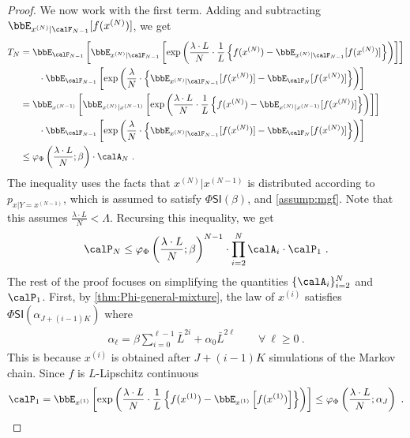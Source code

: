 \documentclass[11pt]{article}
\newcounter{ct}
\newcommand{\PhiSI}[1]{\Phi\mathsf{SI}\left(#1\right)}
\begin{document}
\begin{proof}
We now work with the first term.
Adding and subtracting \(\bbE_{x^{(N)} | \calF_{N - 1}}[f(x^{(N)})]\), we get
\begin{align*}
    T_{N} &= \bbE_{\calF_{N - 1}}\left[\bbE_{x^{(N)} | \calF_{N - 1}}\left[\exp\left(\frac{\lambda \cdot L}{N} \cdot \frac{1}{L}\left\{f(x^{(N)}) - \bbE_{x^{(N)} | \calF_{N - 1}}[f(x^{(N)})]\right\}\right)\right]\right] \\
    &\qquad \cdot \bbE_{\calF_{N - 1}}\left[\exp\left(\frac{\lambda}{N} \cdot \left\{\bbE_{x^{(N)} | \calF_{N - 1}}[f(x^{(N)})] - \bbE_{\calF_{N}}[f(x^{(N)})]\right\}\right)\right] \\
    &= \bbE_{x^{(N - 1)}}\left[\bbE_{x^{(N)} | x^{(N - 1)}}\left[\exp\left(\frac{\lambda \cdot L}{N} \cdot \frac{1}{L}\left\{f(x^{(N)}) - \bbE_{x^{(N)} | x^{(N - 1)}}[f(x^{(N)})]\right\}\right)\right]\right] \\
    &\qquad \cdot \bbE_{\calF_{N - 1}}\left[\exp\left(\frac{\lambda}{N} \cdot \left\{\bbE_{x^{(N)} | \calF_{N - 1}}[f(x^{(N)})] - \bbE_{\calF_{N}}[f(x^{(N)})]\right\}\right)\right] \\
    &\leq \varphi_{\Phi}\left(\frac{\lambda \cdot L}{N}; \beta\right) \cdot \calA_{N}~.
\end{align*}
The inequality uses the facts that \(x^{(N)} | x^{(N - 1)}\) is distributed according to \(p_{x | Y = x^{(N - 1)}}\), which is assumed to satisfy \(\PhiSI{\beta}\), and \cref{assump:mgf}.
Note that this assumes \(\frac{\lambda \cdot L}{N} < \Lambda\).
Recursing this inequality, we get
\begin{equation*}
    \calP_{N} \leq \varphi_{\Phi}\left(\frac{\lambda \cdot L}{N}; \beta\right)^{N - 1} \cdot \prod_{i=2}^{N} \calA_{i} \cdot \calP_{1}~.
\end{equation*}
The rest of the proof focuses on simplifying the quantities \(\{\calA_{i}\}_{i=2}^{N}\) and \(\calP_{1}\).
First, by \cref{thm:Phi-general-mixture}, the law of \(x^{(i)}\) satisfies \(\PhiSI{\alpha_{J + (i - 1) K}}\) where
\begin{align*}
    \alpha_{\ell} = \beta \sum_{i=0}^{\ell - 1} \bar{L}^{2i} + \alpha_{0}\bar{L}^{2\ell} \qquad \forall ~\ell \geq 0~.
\end{align*}
This is because \(x^{(i)}\) is obtained after \(J + (i -1)K\) simulations of the Markov chain.
Since \(f\) is \(L\)-Lipschitz continuous
\begin{equation*}
    \calP_{1} = \bbE_{x^{(1)}}\left[\exp\left(\frac{\lambda \cdot L}{N} \cdot \frac{1}{L} \left\{f(x^{(1)}) - \bbE_{x^{(1)}}\left[f(x^{(1)})\right]\right\}\right)\right] \leq \varphi_{\Phi}\left(\frac{\lambda \cdot L}{N}; \alpha_{J}\right)~.

\end{equation*}
\end{proof}
\end{document}

